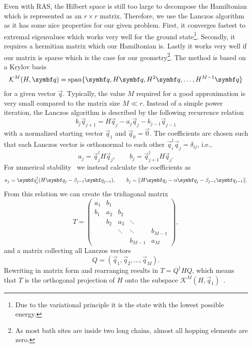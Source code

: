 Even with RAS,
the Hilbert space is still too large to decompose the Hamiltonian
which is represented as an $r\times r$ matrix.
Therefore,
we use the Lanczos algorithm~\cite{Lanczos1950}
as it has some nice properties for our given problem.
First,
it converges fastest to extremal eigenvalues which
works very well for the ground state\footnote{
    Due to the variational principle it is the state with the lowest possible energy.
}.
Secondly, it requires a hermitian matrix which our Hamiltonian is.
Lastly it works very well if our matrix is sparse which is the case for our geometry\footnote{
    As most bath sites are inside two long chains,
    almost all hopping elements are zero.
}.
The method is based on a Krylov basis
\begin{equation}
    \mathcal{K}^M(H, \vec{q}) = \spn\{\vec{q}, H\vec{q}, H^2\vec{q}, \ldots, H^{M-1}\vec{q}\}
\end{equation}
for a given vector $\vec{q}$.
Typically,
the value $M$ required for a good approximation
is very small compared to the matrix size $M \ll r$.
Instead of a simple power iteration, the Lanczos algorithm is described by the
following recurrence relation
\begin{equation}
    b_j\vec{q}_{j+1} = H\vec{q}_j - a_j\vec{q}_j - b_{j-1}\vec{q}_{j-1}
    \label{eq:Lanczos-recurrence}
\end{equation}
with a normalized starting vector $\vec{q}_1$ and $\vec{q}_0 = \vec{0}$.
The coefficients are chosen such that each Lanczos vector is orthonormal to each other
$\vec{q}_i^\dag \vec{q}_j = \delta_{ij}$, i.e.,
\begin{equation}
    a_j = \vec{q}_j^\dag H \vec{q}_j,
    \qquad
    b_j = \vec{q}_{j+1}^\dag H \vec{q}_j.
\end{equation}
For numerical stability~\cite{Paige1972, Paige1976}
we instead calculate the coefficients as
\begin{equation}
    a_j = \vec{q}_j^\dag(H \vec{q}_j - \beta_{j-1}\vec{q}_{j-1}),
    \qquad
    b_j = \norm{H\vec{q}_j - \alpha\vec{q}_j -  \beta_{j-1}\vec{q}_{j-1}}.
\end{equation}
From this relation we can create the tridiagonal matrix
\begin{equation}
    T
    =
    \begin{pmatrix}
        a_1 & b_1 &        &         &         \\
        b_1 & a_2 & b_2    &         &         \\
            & b_2 & a_3    & \ddots  &         \\
            &     & \ddots & \ddots  & b_{M-1} \\
            &     &        & b_{M-1} & a_M
    \end{pmatrix},
    \label{eq:tridiagonal-scalar}
\end{equation}
and a matrix collecting all Lanczos vectors
\begin{equation}
    Q = (\vec{q}_1, \vec{q}_2, \ldots, \vec{q}_M).
\end{equation}
Rewriting  in matrix form and rearranging results in $T = Q^\dag H Q$,
which means that $T$ is the orthogonal projection of $H$ onto
the subspace $\mathcal{K}^M(H, \vec{q}_1)$~\cite{Cullum1985}.

